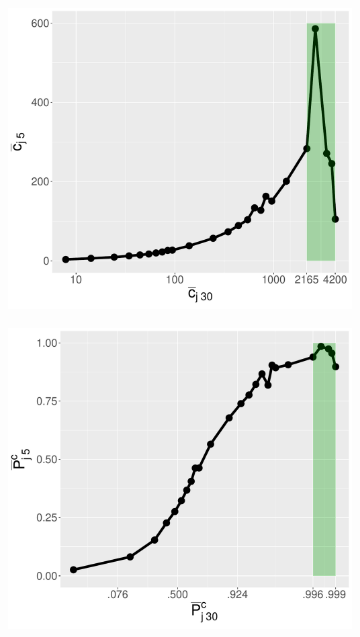 \begin{figure}
\begin{subfigure}[b]{0.48\textwidth}
         \caption{}
         \label{fig:pred_rp_age}
     \end{subfigure}
     \hfill
     \begin{subfigure}[b]{0.48\textwidth}
         \centering
         \includegraphics[width=\textwidth]{figures/pred_power/ncit_vs_pubrp/cit_cit.pdf}
         \caption{}
         \label{fig:pred_cit_cit}
     \end{subfigure}
     \hfill
     \begin{subfigure}[b]{0.48\textwidth}
         \centering
         \includegraphics[width=\textwidth]{figures/pred_power/ncit_vs_pubrp/rp_rp.pdf}

\end{subfigure}
\end{figure}

